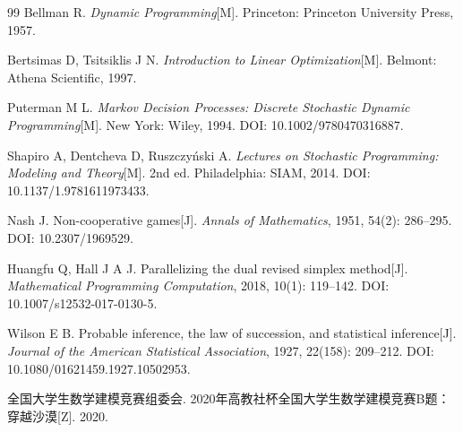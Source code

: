 \begin{thebibliography}{99}
Bellman R. \textit{Dynamic Programming}[M]. Princeton: Princeton University Press, 1957.

Bertsimas D, Tsitsiklis J N. \textit{Introduction to Linear Optimization}[M]. Belmont: Athena Scientific, 1997.

Puterman M L. \textit{Markov Decision Processes: Discrete Stochastic Dynamic Programming}[M]. New York: Wiley, 1994. DOI: 10.1002/9780470316887.

Shapiro A, Dentcheva D, Ruszczyński A. \textit{Lectures on Stochastic Programming: Modeling and Theory}[M]. 2nd ed. Philadelphia: SIAM, 2014. DOI: 10.1137/1.9781611973433.

Nash J. Non-cooperative games[J]. \textit{Annals of Mathematics}, 1951, 54(2): 286--295. DOI: 10.2307/1969529.

Huangfu Q, Hall J A J. Parallelizing the dual revised simplex method[J]. \textit{Mathematical Programming Computation}, 2018, 10(1): 119--142. DOI: 10.1007/s12532-017-0130-5.

Wilson E B. Probable inference, the law of succession, and statistical inference[J]. \textit{Journal of the American Statistical Association}, 1927, 22(158): 209--212. DOI: 10.1080/01621459.1927.10502953.

全国大学生数学建模竞赛组委会. 2020年高教社杯全国大学生数学建模竞赛B题：穿越沙漠[Z]. 2020.
\end{thebibliography}
